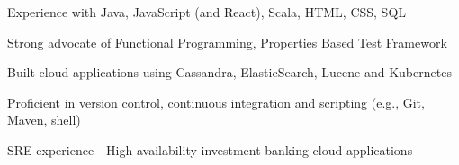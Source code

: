 \begin{cvitems}
\sectionspace
\sectionspace
\vspace{1mm}
	\fontsize{11pt}{1.4em}\bodyfontlight\upshape\color{text}
        \item {Experience with Java, JavaScript (and React), Scala, HTML, CSS, SQL}
        \item {Strong advocate of Functional Programming, Properties Based Test Framework}
        \item {Built cloud applications using Cassandra, ElasticSearch, Lucene and Kubernetes}
        \item {Proficient in version control, continuous integration and scripting (e.g., Git, Maven, shell)}
        \item {SRE experience - High availability investment banking cloud applications}
        \end{cvitems}
\vspace{1mm}
\sectionspace
